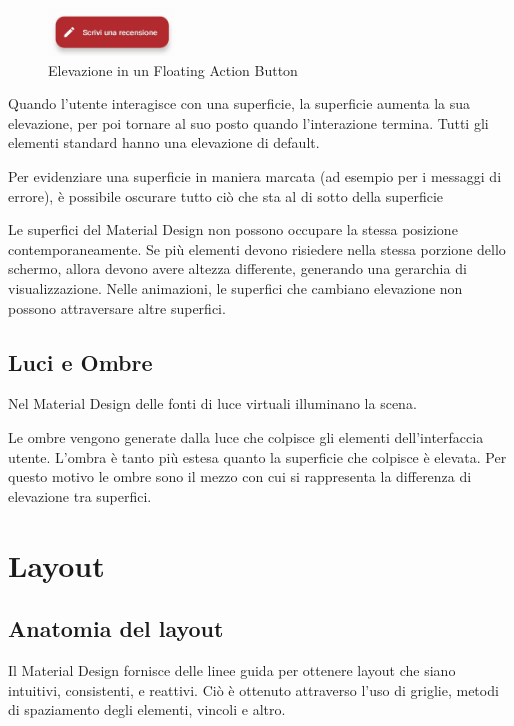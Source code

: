 \documentclass[12pt, a4paper]{report}
\begin{document}
		\begin{figure}[h]
   			\centering
   			\includegraphics[width=0.3\textwidth]{elevation}
 			\caption{Elevazione in un Floating Action Button}
    			\label{fig:mesh1}
		\end{figure}

		Quando l'utente interagisce con una superficie, la superficie aumenta la sua elevazione, per poi tornare al suo posto quando l'interazione termina. Tutti gli elementi standard hanno una elevazione di default.

		Per evidenziare una superficie in maniera marcata (ad esempio per i messaggi di errore), è possibile oscurare tutto ciò che sta al di sotto della superficie
	
		Le superfici del Material Design non possono occupare la stessa posizione contemporaneamente. Se più elementi devono risiedere nella stessa porzione dello schermo, allora devono avere altezza differente, generando una gerarchia di visualizzazione. Nelle animazioni, le superfici che cambiano elevazione non possono attraversare altre superfici.

		\subsection{Luci e Ombre}
		Nel Material Design delle fonti di luce virtuali illuminano la scena.
		
		Le ombre vengono generate dalla luce che colpisce gli elementi dell'interfaccia utente. L'ombra è tanto più estesa quanto la superficie che colpisce è elevata. Per questo motivo le ombre sono il mezzo con cui si rappresenta la differenza di elevazione tra superfici.


	\section{Layout}
		
		\subsection{Anatomia del layout}
		Il Material Design fornisce delle linee guida per ottenere layout che siano intuitivi, consistenti, e reattivi. Ciò è ottenuto attraverso l'uso di griglie, metodi di spaziamento degli elementi, vincoli e altro.\cite{layout_start}
\end{document}
